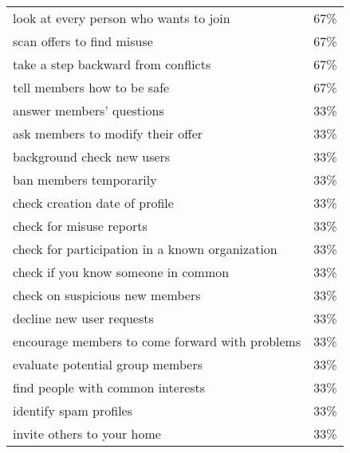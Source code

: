 \begin{longtable}{p{}r}
look at every person who wants to join                              & 67\%                        \\
scan offers to find misuse                                          & 67\%                        \\
take a step backward from conflicts                                 & 67\%                        \\
tell members how to be safe                                         & 67\%                        \\
answer members' questions                                           & 33\%                        \\
ask members to modify their offer                                   & 33\%                        \\
background check new users                                          & 33\%                        \\
ban members temporarily                                             & 33\%                        \\
check creation date of profile                                      & 33\%                        \\
check for misuse reports                                            & 33\%                        \\
check for participation in a known organization                     & 33\%                        \\
check if you know someone in common                                 & 33\%                        \\
check on suspicious new members                                     & 33\%                        \\
decline new user requests                                           & 33\%                        \\
encourage members to come forward with problems                     & 33\%                        \\
evaluate potential group members                                    & 33\%                        \\
find people with common interests                                   & 33\%                        \\
identify spam profiles                                              & 33\%                        \\
invite others to your home                                          & 33\%                        \\

\end{longtable}
